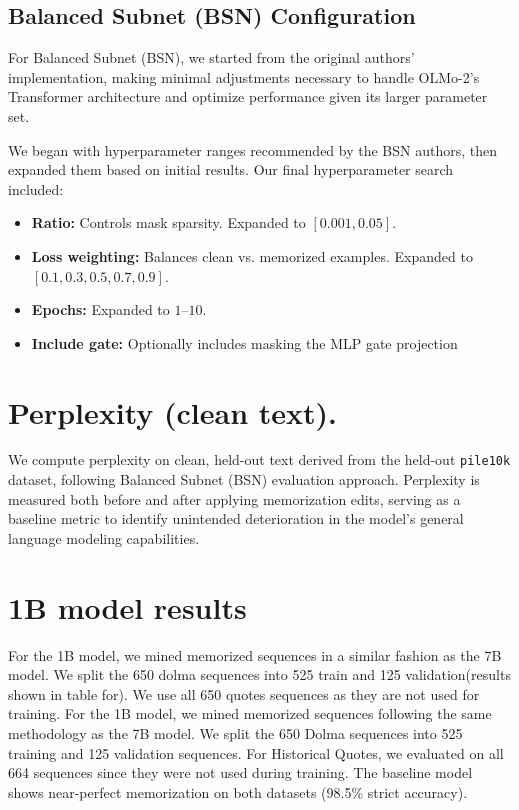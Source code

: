 \documentclass{article} %
\begin{document}
\subsection{Balanced Subnet (BSN) Configuration}
For Balanced Subnet (BSN), we started from the original authors' implementation, making minimal adjustments necessary to handle OLMo-2’s Transformer architecture and optimize performance given its larger parameter set.

We began with hyperparameter ranges recommended by the BSN authors, then expanded them based on initial results. Our final hyperparameter search included:
\begin{itemize}
    \item \textbf{Ratio:} Controls mask sparsity. Expanded to $[0.001, 0.05]$.
    \item \textbf{Loss weighting:} Balances clean vs. memorized examples. Expanded to $[0.1, 0.3, 0.5, 0.7, 0.9]$.
    \item \textbf{Epochs:} Expanded to $1$--$10$.
    \item \textbf{Include gate:} Optionally includes masking the MLP gate projection 
\end{itemize}

\section{Perplexity (clean text).}
We compute perplexity on clean, held-out text derived from the held-out \texttt{pile10k} dataset, following Balanced Subnet (BSN) evaluation approach. Perplexity is measured both before and after applying memorization edits, serving as a baseline metric to identify unintended deterioration in the model's general language modeling capabilities.

\section{1B model results}
\label{sec:1b_results}
For the 1B model, we mined memorized sequences in a similar fashion as the 7B model. We split the 650 dolma sequences into 525 train and 125 validation(results shown in table for). We use all 650 quotes sequences as they are not used for training.
For the 1B model, we mined memorized sequences following the same methodology as the 7B model. We split the 650 Dolma sequences into 525 training and 125 validation sequences. For Historical Quotes, we evaluated on all 664 sequences since they were not used during training. The baseline model shows near-perfect memorization on both datasets (98.5\% strict accuracy).
\end{document}
